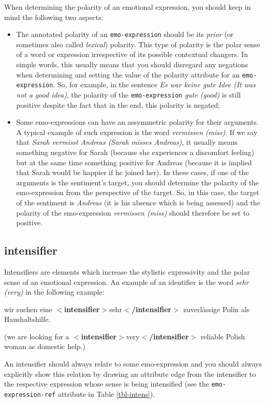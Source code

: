 \documentclass[11pt,a4paper]{article}
\newcommand{\xmltag}[1]{{\textbf{\small$<$#1$>$}}}
\newcommand{\intensifier}[1]{\xmltag{intensifier}#1\xmltag{/intensifier}}
\newenvironment{myexe}{
  \begin{exe}
    \ex\begin{center}
    \itshape
}{
    \end{center}
  \end{exe}
}
\begin{document}
When determining the polarity of an emotional expression, you should keep in
mind the following two aspects:
\begin{itemize}
  \item The annotated polarity of an \texttt{emo-expression} should be its
    \textit{prior} (or sometimes also called \textit{lexical}) polarity.  This
    type of polarity is the polar sense of a word or expression irrespective
    of its possible contextual changers.  In simple words, this usually means
    that you should disregard any negations when determining and setting the
    value of the polarity attribute for an \texttt{emo-expression}. So, for
    example, in the sentence \textit{Es war keine gute Idee (It was not a good
      idea)}, the polarity of the \texttt{emo-expression} \textit{gute (good)}
    is still positive despite the fact that in the end, this polarity is
    negated;

  \item Some emo-expressions can have an assymmetric polarity for their
    arguments.  A typical example of such expression is the word
    \textit{vermissen (miss)}.  If we say that \textit{Sarah vermisst Andreas
      (Sarah misses Andreas)}, it usually means something negative for Sarah
    (because she experiences a discomfort feeling) but at the same time
    something positive for Andreas (because it is implied that Sarah would be
    happier if he joined her).  In these cases, if one of the arguments is the
    sentiment's target, you should determine the polarity of the
    emo-expression from the perspective of the target.  So, in this case, the
    target of the sentiment is \textit{Andreas} (it is his absence which is
    being assessed) and the polarity of the emo-expression \textit{vermissen
      (miss)} should therefore be set to positive.
\end{itemize}

\subsection{intensifier}
Intensifiers are elements which increase the stylistic expressivity and the
polar sense of an emotional expression.  An example of an identifier is the
word \textit{sehr (very)} in the following example:
\begin{myexe}
  wir suchen eine \intensifier{sehr} zuverl\"assige Polin als
  Haushaltshilfe.

  (we are looking for a \intensifier{very} reliable Polish woman as
  domestic help.)
\end{myexe}
An intensifier should always relate to some emo-expression and you should
always explicitly show this relation by drawing an attribute edge from the
intensifier to the respective expression whose sense is being intensified
(see the \texttt{emo-expression-ref} attribute in Table \ref{tbl-intens}).
\end{document}
